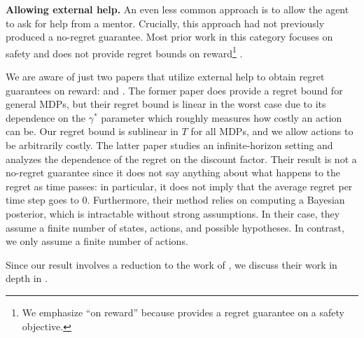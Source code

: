 \textbf{Allowing external help.} An even less common approach is to allow the agent to ask for help from a mentor. Crucially, this approach had not previously produced a no-regret guarantee. Most prior work in this category focuses on safety and does not provide regret bounds on reward\footnote{We emphasize ``on reward'' because \citet{plaut_avoiding_2024} provides a regret guarantee on a safety objective.} \citep{cohen_pessimism_2020, plaut_avoiding_2024}. 

We are aware of just two papers that utilize external help to obtain regret guarantees on reward: \citet{maillard_active_2019} and \citet{kosoy_delegative_2019}. The former paper \citep{maillard_active_2019} does provide a regret bound for general MDPs, but their regret bound is linear in the worst case due to its dependence on the $\gamma^*$ parameter which roughly measures how costly an action can be. Our regret bound is sublinear in $T$ for all MDPs, and we allow actions to be arbitrarily costly. The latter paper \citep{kosoy_delegative_2019} studies an infinite-horizon setting and analyzes the dependence of the regret on the discount factor. Their result is not a no-regret guarantee since it does not say anything about what happens to the regret as time passes: in particular, it does not imply that the average regret per time step goes to 0. Furthermore, their method relies on computing a Bayesian posterior, which is intractable without strong assumptions. In their case, they assume a finite number of states, actions, and possible hypotheses. In contrast, we only assume a finite number of actions.

Since our result involves a reduction to the work of \citet{plaut_avoiding_2024}, we discuss their work in depth in . 
